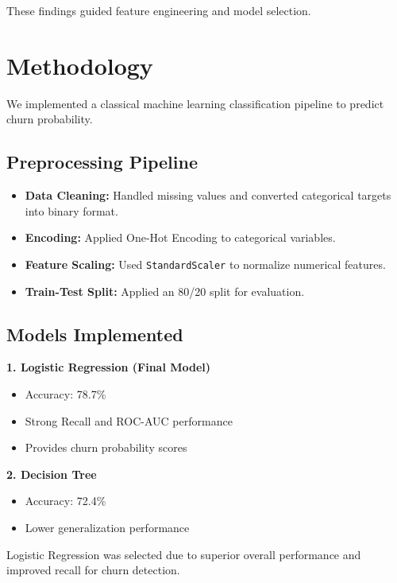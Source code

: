 \documentclass[12pt,a4paper]{article}
\begin{document}
These findings guided feature engineering and model selection.


\section{Methodology}

We implemented a classical machine learning classification pipeline to predict churn probability.

\subsection*{Preprocessing Pipeline}

\begin{itemize}
    \item \textbf{Data Cleaning:} Handled missing values and converted categorical targets into binary format.
    \item \textbf{Encoding:} Applied One-Hot Encoding to categorical variables.
    \item \textbf{Feature Scaling:} Used \texttt{StandardScaler} to normalize numerical features.
    \item \textbf{Train-Test Split:} Applied an 80/20 split for evaluation.
\end{itemize}

\subsection*{Models Implemented}

\textbf{1. Logistic Regression (Final Model)}
\begin{itemize}
    \item Accuracy: 78.7\%
    \item Strong Recall and ROC-AUC performance
    \item Provides churn probability scores
\end{itemize}

\textbf{2. Decision Tree}
\begin{itemize}
    \item Accuracy: 72.4\%
    \item Lower generalization performance
\end{itemize}

Logistic Regression was selected due to superior overall performance and improved recall for churn detection.
\end{document}

